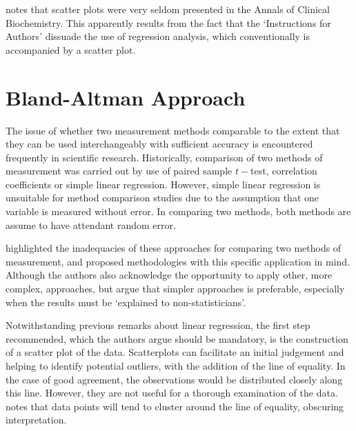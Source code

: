 \documentclass[12pt, a4paper]{report}
\theoremstyle{plain}
\theoremstyle{definition}
\theoremstyle{remark}
\begin{document}
	
	\citet{Dewitte} notes that scatter plots were very seldom
	presented in the Annals of Clinical Biochemistry. This apparently
	results from the fact that the `Instructions for Authors' dissuade
	the use of regression analysis, which conventionally is
	accompanied by a scatter plot.
	
	\newpage
	\section{Bland-Altman Approach}
	The issue of whether two measurement methods comparable to the
	extent that they can be used interchangeably with sufficient
	accuracy is encountered frequently in scientific research.
	Historically, comparison of two methods of measurement was carried
	out by use of paired sample $t-$test, correlation coefficients or
	simple linear regression. However, simple linear regression is unsuitable for method comparison studies due to the assumption that one variable is measured without error. In comparing two methods, both methods are assume to have attendant random error.
	
	\citet{BA83} highlighted the inadequacies of these approaches for comparing two methods of measurement, and proposed methodologies with this specific application in mind. Although the authors also acknowledge the opportunity to apply other, more complex, approaches, but argue that simpler approaches is preferable, especially when the
	results must be `explained to non-statisticians'.
	
	Notwithstanding previous remarks about linear regression, the first step recommended, which the authors argue should be mandatory, is the construction of a scatter plot of the data. Scatterplots can facilitate an initial judgement and
	helping to identify potential outliers, with the addition of the line of equality. In the case of good agreement, the observations would be distributed closely along this line. However, they are not useful for a thorough examination of the data. \citet{BritHypSoc} notes that
	data points will tend to cluster around the line of equality, obscuring interpretation.
	
\end{document}
